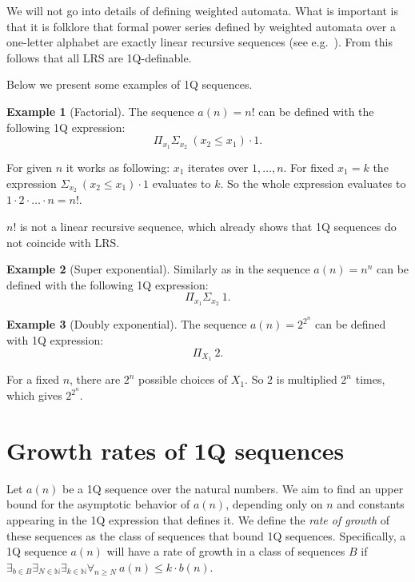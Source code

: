 \documentclass[en]{pracamgr}
\theoremstyle{definition}
\newtheorem{example}{Example}[section]
\begin{document}
We will not go into details of defining weighted automata. What is important is that it is folklore that formal power series defined by weighted automata over a one-letter alphabet are exactly linear recursive sequences (see e.g.~\cite{BarloyFLM22}). From this follows that all LRS are 1Q-definable.

Below we present some examples of 1Q sequences.

\begin{example}[Factorial]
\label{ExSeqFactorial}
    The sequence $a(n) = n!$ can be defined with the following 1Q expression: 
    $$\Pi_{x_1}\Sigma_{x_2} \ (x_2 \leq x_1) \cdot 1.$$

    For given $n$ it works as following: $x_1$ iterates over $1,\ldots,n$. For fixed $x_1 = k$ the expression $\Sigma_{x_2} \ (x_2 \leq x_1) \cdot 1$ evaluates to $k$. So the whole expression evaluates to $1 \cdot 2 \cdot \ldots \cdot n = n!$.

    $n!$ is not a linear recursive sequence, which already shows that 1Q sequences do not coincide with LRS.
\end{example}

\begin{example}[Super exponential]
\label{ExSeqNToN}
    Similarly as in  the sequence $a(n) = n^n$ can be defined with the following 1Q expression:
    $$\Pi_{x_1}\Sigma_{x_2} \ 1.$$
\end{example}

\begin{example}[Doubly exponential]
\label{ExSeqDoubleExponential}
    The sequence $a(n) = 2^{2^n}$ can be defined with 1Q expression:
    $$\Pi_{X_1} \ 2.$$

    For a fixed $n$, there are $2^n$ possible choices of $X_1$. So $2$ is multiplied $2^n$ times, which gives $2^{2^n}$.
\end{example}

\chapter{Growth rates of 1Q sequences}
\label{Sec1QRateOfGrowth}
Let $a(n)$ be a 1Q sequence over the natural numbers. We aim to find an upper bound for the asymptotic behavior of $a(n)$, depending only on $n$ and constants appearing in the 1Q expression that defines it. We define the \emph{rate of growth} of these sequences as the class of sequences that bound 1Q sequences. Specifically, a 1Q sequence $a(n)$ will have a rate of growth in a class of sequences $B$ if $\exists_{b \in B} \exists_{N \in \mathbb{N}} \exists_{k \in \mathbb{N}} \forall_{n \geq N} \ a(n) \leq k \cdot b(n)$.
\end{document}

